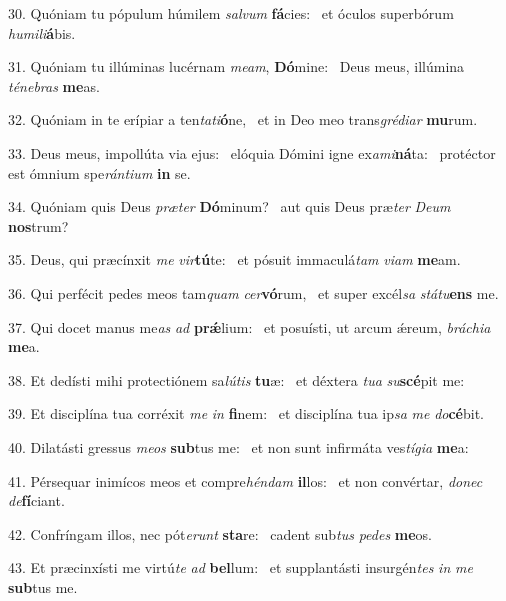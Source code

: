 30. Quóniam tu pópulum húmilem \textit{sal}\textit{vum} \textbf{fá}cies: \ast\  et óculos superbórum \textit{hu}\textit{mi}\textit{li}\textbf{á}bis.\

31. Quóniam tu illúminas lucérnam \textit{me}\textit{am}, \textbf{Dó}mine: \ast\  Deus meus, illúmina \textit{té}\textit{ne}\textit{bras} \textbf{me}as.\

32. Quóniam in te erípiar a ten\textit{ta}\textit{ti}\textbf{ó}ne, \ast\  et in Deo meo trans\textit{gré}\textit{di}\textit{ar} \textbf{mu}rum.\

33. Deus meus, impollúta via ejus: \dag\  elóquia Dómini igne ex\textit{a}\textit{mi}\textbf{ná}ta: \ast\  protéctor est ómnium spe\textit{rán}\textit{ti}\textit{um} \textbf{in} se.\

34. Quóniam quis Deus \textit{præ}\textit{ter} \textbf{Dó}minum? \ast\  aut quis Deus præ\textit{ter} \textit{De}\textit{um} \textbf{nos}trum?\

35. Deus, qui præcínxit \textit{me} \textit{vir}\textbf{tú}te: \ast\  et pósuit immaculá\textit{tam} \textit{vi}\textit{am} \textbf{me}am.\

36. Qui perfécit pedes meos tam\textit{quam} \textit{cer}\textbf{vó}rum, \ast\  et super excél\textit{sa} \textit{stá}\textit{tu}\textbf{ens} me.\

37. Qui docet manus me\textit{as} \textit{ad} \textbf{prǽ}lium: \ast\  et posuísti, ut arcum ǽreum, \textit{brá}\textit{chi}\textit{a} \textbf{me}a.\

38. Et dedísti mihi protectiónem sa\textit{lú}\textit{tis} \textbf{tu}æ: \ast\  et déxtera \textit{tu}\textit{a} \textit{su}\textbf{scé}pit me:\

39. Et disciplína tua corréxit \textit{me} \textit{in} \textbf{fi}nem: \ast\  et disciplína tua ip\textit{sa} \textit{me} \textit{do}\textbf{cé}bit.\

40. Dilatásti gressus \textit{me}\textit{os} \textbf{sub}tus me: \ast\  et non sunt infirmáta ves\textit{tí}\textit{gi}\textit{a} \textbf{me}a:\

41. Pérsequar inimícos meos et compre\textit{hén}\textit{dam} \textbf{il}los: \ast\  et non convértar, \textit{do}\textit{nec} \textit{de}\textbf{fí}ciant.\

42. Confríngam illos, nec pót\textit{e}\textit{runt} \textbf{sta}re: \ast\  cadent sub\textit{tus} \textit{pe}\textit{des} \textbf{me}os.\

43. Et præcinxísti me virtú\textit{te} \textit{ad} \textbf{bel}lum: \ast\  et supplantásti insurgén\textit{tes} \textit{in} \textit{me} \textbf{sub}tus me.\

